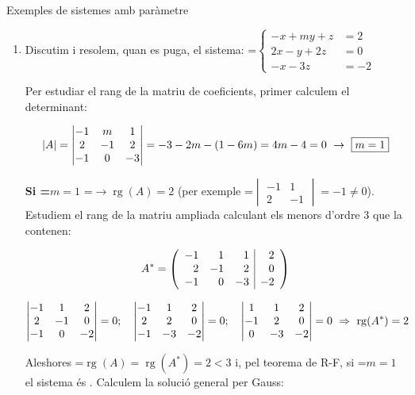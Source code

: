 \documentclass[11pt,a4paper]{article}
\newcommand{\fmm}[1]{\setbox0=\hbox{$#1$}\ifdim\wd0>\linewidth\fmdisp{#1}\else\mbox{\box0}\fi}
\newcommand{\fmdisp}[1]{\[\setbox2=\hbox{$\displaystyle #1$}\ifdim\wd2>\linewidth\resizebox{\linewidth}{!}{\box2}\else\box2\fi\]}
\newcommand{\fmbadge}[2]{\tcbox[on line,colback=#1,colframe=#1,arc=2mm,boxsep=0pt,left=4pt,right=4pt,top=1.5pt,bottom=1.5pt]{\color{white}\footnotesize\bfseries #2}}
\begin{document}
\begin{fmex}{Exemples de sistemes amb paràmetre}
\begin{enumerate}[label=\textbf{\arabic*.},leftmargin=*]
\item Discutim i resolem, quan es puga, el sistema: \fmm{\left\{\begin{aligned}-x+my+z&=2\\ 2x-y+2z&=0\\ -x-3z&=-2\end{aligned}\right.}

Per estudiar el rang de la matriu de coeficients, primer calculem el determinant:

\fmdisp{|A|=\begin{vmatrix}-1 & m & 1\\ 2 & -1 & 2\\ -1 & 0 & -3\end{vmatrix}=-3-2m-(1-6m)=4m-4=0\ \rightarrow\ \boxed{m=1}}

\textbf{Si \fmm{m=1}} \fmm{\rightarrow\operatorname{rg}(A)=2} (per exemple \fmm{\begin{vmatrix}-1 & 1\\ 2 & -1\end{vmatrix}=-1\neq0}). Estudiem el rang de la matriu ampliada calculant els menors d'ordre 3 que la contenen:

\fmdisp{A^*=\left(\begin{array}{rrr|r}-1 & 1 & 1 & 2\\ 2 & -1 & 2 & 0\\ -1 & 0 & -3 & -2\end{array}\right)}

\fmdisp{\begin{vmatrix}-1 & 1 & 2\\ 2 & -1 & 0\\ -1 & 0 & -2\end{vmatrix}=0;\quad\begin{vmatrix}-1 & 1 & 2\\ 2 & 2 & 0\\ -1 & -3 & -2\end{vmatrix}=0;\quad\begin{vmatrix}1 & 1 & 2\\ -1 & 2 & 0\\ 0 & -3 & -2\end{vmatrix}=0\ \Rightarrow\ \operatorname{rg}(A^*)=2}

Aleshores \fmm{\operatorname{rg}(A)=\operatorname{rg}(A^*)=2<3} i, pel teorema de R-F, si \fmm{m=1} el sistema és \fmbadge{fmev}{SCI}. Calculem la solució general per Gauss:


\end{enumerate}
\end{fmex}
\end{document}

